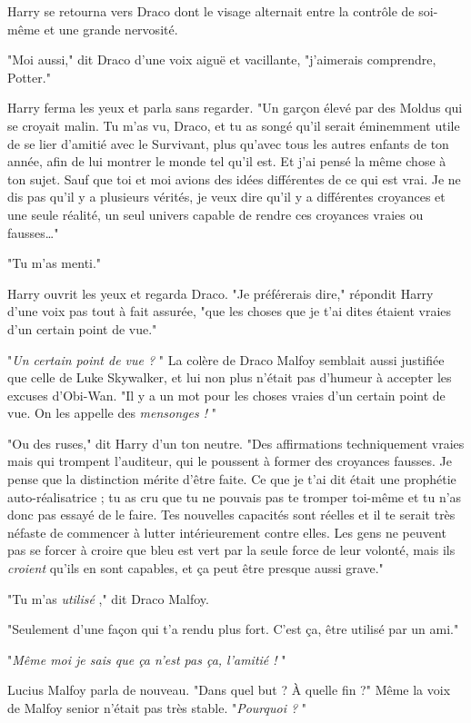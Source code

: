 Harry se retourna vers Draco dont le visage alternait entre la contrôle de soi-même et une grande nervosité.

"Moi aussi," dit Draco d'une voix aiguë et vacillante, "j'aimerais comprendre, Potter."

Harry ferma les yeux et parla sans regarder. "Un garçon élevé par des Moldus qui se croyait malin. Tu m'as vu, Draco, et tu as songé qu'il serait éminemment utile de se lier d'amitié avec le Survivant, plus qu'avec tous les autres enfants de ton année, afin de lui montrer le monde tel qu'il est. Et j'ai pensé la même chose à ton sujet. Sauf que toi et moi avions des idées différentes de ce qui est vrai. Je ne dis pas qu'il y a plusieurs vérités, je veux dire qu'il y a différentes croyances et une seule réalité, un seul univers capable de rendre ces croyances vraies ou fausses…"

"Tu m'as menti."

Harry ouvrit les yeux et regarda Draco. "Je préférerais dire," répondit Harry d'une voix pas tout à fait assurée, "que les choses que je t'ai dites étaient vraies d'un certain point de vue."

"\emph{Un certain point de vue ?} " La colère de Draco Malfoy semblait aussi justifiée que celle de Luke Skywalker, et lui non plus n'était pas d'humeur à accepter les excuses d'Obi-Wan. "Il y a un mot pour les choses vraies d'un certain point de vue. On les appelle des \emph{mensonges !} "

"Ou des ruses," dit Harry d'un ton neutre. "Des affirmations techniquement vraies mais qui trompent l'auditeur, qui le poussent à former des croyances fausses. Je pense que la distinction mérite d'être faite. Ce que je t'ai dit était une prophétie auto-réalisatrice ; tu as cru que tu ne pouvais pas te tromper toi-même et tu n'as donc pas essayé de le faire. Tes nouvelles capacités sont réelles et il te serait très néfaste de commencer à lutter intérieurement contre elles. Les gens ne peuvent pas se forcer à croire que bleu est vert par la seule force de leur volonté, mais ils \emph{croient}  qu'ils en sont capables, et ça peut être presque aussi grave."

"Tu m'as \emph{utilisé} ," dit Draco Malfoy.

"Seulement d'une façon qui t'a rendu plus fort. C'est ça, être utilisé par un ami."

"\emph{Même moi je sais que ça n'est pas ça, l'amitié !} "

Lucius Malfoy parla de nouveau. "Dans quel but ? À quelle fin ?" Même la voix de Malfoy senior n'était pas très stable. "\emph{Pourquoi ?} "

